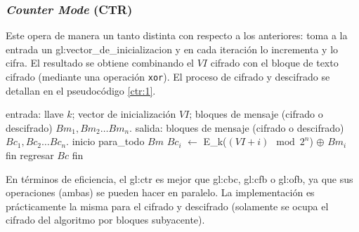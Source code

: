 %
%

\subsubsection{\textit{Counter Mode} (CTR)}
\label{sec:ctr}

Este opera de manera un tanto distinta con respecto a los anteriores: toma a
la entrada un \gls{gl:vector_de_inicializacion} y en cada iteración lo
incrementa y lo cifra. El resultado se obtiene combinando el $ VI $ cifrado
con el bloque de texto cifrado (mediante una operación \verb|xor|). El proceso
de cifrado y descifrado se detallan en el pseudocódigo \ref{ctr:1}.

\begin{pseudocodigo}[%
    caption={\Gls{gl:modo_de_operacion} \gls{gl:ctr}%
      (cifrado y descifrado).},
    label={ctr:1}%
  ]
  entrada: llave $ k $; vector de inicialización $ VI $;
           bloques de mensaje (cifrado o descifrado) $ Bm_1, Bm_2 \dots Bm_n $.
  salida:  bloques de mensaje (cifrado o descifrado) $ Bc_1, Bc_2 \dots Bc_n $.
  inicio
    para_todo $Bm$
      $Bc_i$ $\gets$ E_k($ (VI + i) \mod 2^n $) $\oplus$ $Bm_i$
    fin
    regresar $Bc$
  fin
\end{pseudocodigo}

En términos de eficiencia, el \gls{gl:ctr} es mejor que \gls{gl:cbc},
\gls{gl:cfb} o \gls{gl:ofb}, ya que sus operaciones (ambas) se pueden hacer
en paralelo. La implementación es prácticamente la misma para el cifrado y
descifrado (solamente se ocupa el cifrado del algoritmo por bloques
subyacente).
